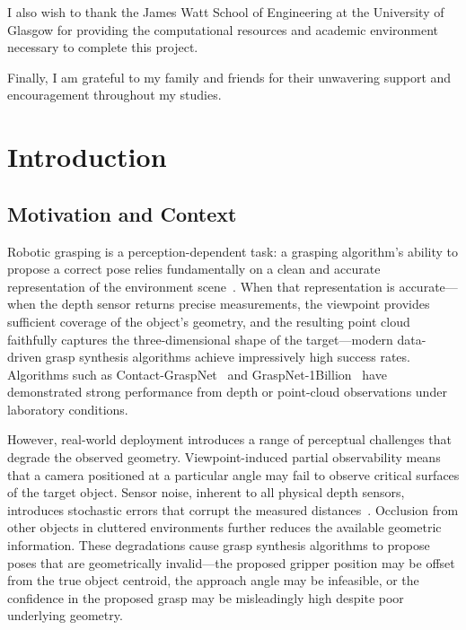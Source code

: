 \documentclass[11pt,a4paper]{report}
\begin{document}
I also wish to thank the James Watt School of Engineering at the University of Glasgow for providing the computational resources and academic environment necessary to complete this project.

Finally, I am grateful to my family and friends for their unwavering support and encouragement throughout my studies.

\tableofcontents
\listoffigures
\listoftables

\chapter{Introduction}
\label{ch:intro}

\section{Motivation and Context}
\label{sec:motivation}

Robotic grasping is a perception-dependent task: a grasping algorithm's ability to propose a correct pose relies fundamentally on a clean and accurate representation of the environment scene~\cite{bohg2014data}. When that representation is accurate---when the depth sensor returns precise measurements, the viewpoint provides sufficient coverage of the object's geometry, and the resulting point cloud faithfully captures the three-dimensional shape of the target---modern data-driven grasp synthesis algorithms achieve impressively high success rates. Algorithms such as Contact-GraspNet~\cite{sundermeyer2021contact} and GraspNet-1Billion~\cite{fang2020graspnet} have demonstrated strong performance from depth or point-cloud observations under laboratory conditions.

However, real-world deployment introduces a range of perceptual challenges that degrade the observed geometry. Viewpoint-induced partial observability means that a camera positioned at a particular angle may fail to observe critical surfaces of the target object. Sensor noise, inherent to all physical depth sensors, introduces stochastic errors that corrupt the measured distances~\cite{khoshelham2011accuracy, nguyen2012modeling}. Occlusion from other objects in cluttered environments further reduces the available geometric information. These degradations cause grasp synthesis algorithms to propose poses that are geometrically invalid---the proposed gripper position may be offset from the true object centroid, the approach angle may be infeasible, or the confidence in the proposed grasp may be misleadingly high despite poor underlying geometry.
\end{document}
